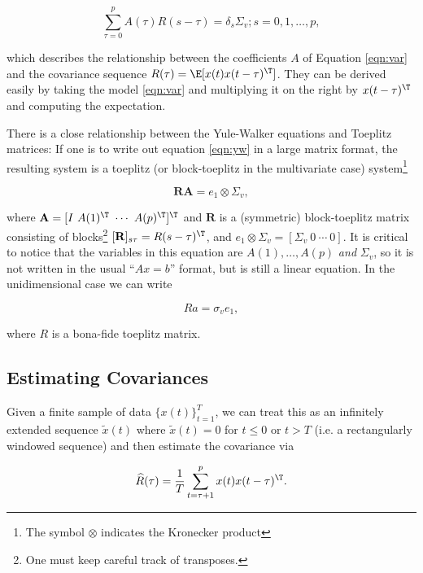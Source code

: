 \documentclass[12pt]{article}
\begin{document}
\begin{equation}
  \label{eqn:yw}
  \sum_{\tau = 0}^p A(\tau) R(s - \tau) = \delta_s \Sigma_v; s = 0, 1, \ldots, p,
\end{equation}

which describes the relationship between the coefficients $A$ of
Equation \eqref{eqn:var} and the covariance sequence
$R(\tau) = \E[x(t)x(t - \tau)^\T]$.  They can be derived easily by
taking the model \eqref{eqn:var} and multiplying it on the right by
$x(t - \tau)^\T$ and computing the expectation.

There is a close relationship between the Yule-Walker equations and
Toeplitz matrices: If one is to write out equation \ref{eqn:yw} in a
large matrix format, the resulting system is a toeplitz (or
block-toeplitz in the multivariate case) system\footnote{The symbol
  $\otimes$ indicates the Kronecker product}

\begin{equation}
  \mathbf{R} \mathbf{A} = e_1 \otimes \Sigma_v,
\end{equation}

where $\mathbf{A} = [I\ A(1)^\T\ \cdots\ A(p)^\T]^\T$ and $\mathbf{R}$
is a (symmetric) block-toeplitz matrix consisting of
blocks\footnote{One must keep careful track of transposes.}
$[\mathbf{R}]_{s\tau} = R(s - \tau)^\T$, and
$e_1 \otimes \Sigma_v = [\Sigma_v\ 0\ \cdots\ 0]$.  It is critical to
notice that the variables in this equation are $A(1), \ldots, A(p)$
\textit{and} $\Sigma_v$, so it is not written in the usual
``$Ax = b$'' format, but is still a linear equation.  In the
unidimensional case we can write

\begin{equation}
  Ra = \sigma_v e_1,
\end{equation}

where $R$ is a bona-fide toeplitz matrix.

\subsection{Estimating Covariances}
Given a finite sample of data $\{x(t)\}_{t = 1}^T$, we can treat this
as an infinitely extended sequence $\widetilde{x}(t)$ where
$\widetilde{x}(t) = 0$ for $t \le 0$ or $t > T$ (i.e. a rectangularly
windowed sequence) and then estimate the covariance via

\begin{equation}
  \widehat{R}(\tau) = \frac{1}{T}\sum_{t = \tau + 1}^px(t)x(t - \tau)^\T.
\end{equation}
\end{document}
